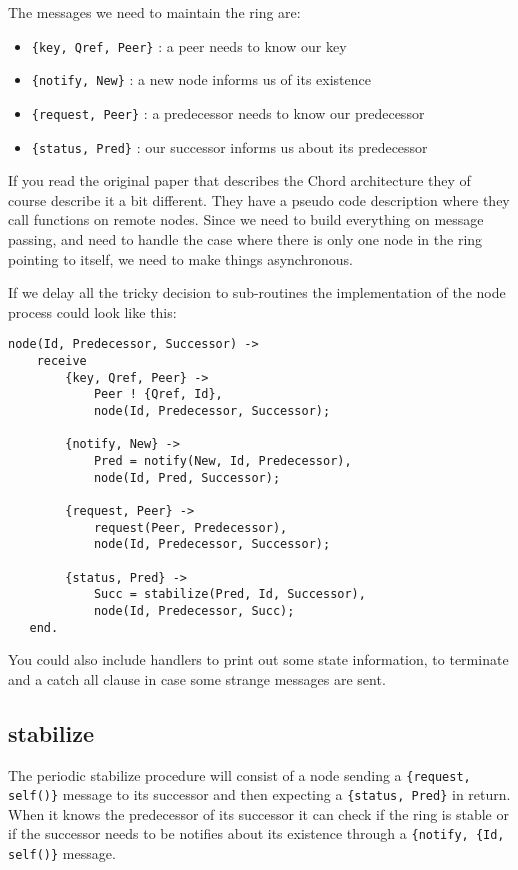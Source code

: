 \documentclass[a4paper,11pt]{article}
\begin{document}
The messages we need to maintain the ring are:

\begin{itemize}
\item {\tt \{key, Qref, Peer\}} : a peer needs to know our key
\item {\tt \{notify, New\}} : a new node informs us of its existence
\item {\tt \{request, Peer\}} : a predecessor needs to know our predecessor
\item {\tt \{status, Pred\}} : our successor informs us about its predecessor
\end{itemize}

If you read the original paper that describes the Chord architecture
they of course describe it a bit different. They have a pseudo code
description where they call functions on remote nodes. Since we need
to build everything on message passing, and need to handle the case
where there is only one node in the ring pointing to itself, we need
to make things asynchronous. 

If we delay all the tricky decision to sub-routines the implementation
of the node process could look like this:

\begin{verbatim}
node(Id, Predecessor, Successor) ->
    receive 
        {key, Qref, Peer} ->
            Peer ! {Qref, Id},
            node(Id, Predecessor, Successor);

        {notify, New} ->
            Pred = notify(New, Id, Predecessor),
            node(Id, Pred, Successor);

        {request, Peer} ->
            request(Peer, Predecessor),
            node(Id, Predecessor, Successor);

        {status, Pred} ->
            Succ = stabilize(Pred, Id, Successor),
            node(Id, Predecessor, Succ);
   end.
\end{verbatim}

You could also include handlers to print out some state information,
to terminate and a catch all clause in case some strange messages are
sent. 

\subsection{stabilize}

The periodic stabilize procedure will consist of a node sending a
{\tt \{request, self()\}} message to its successor and then expecting a
{\tt \{status, Pred\}} in return. When it knows the predecessor of its
successor it can check if the ring is stable or if the successor needs
to be notifies about its existence through a {\tt \{notify, \{Id,
  self()\}} message.
\end{document}
